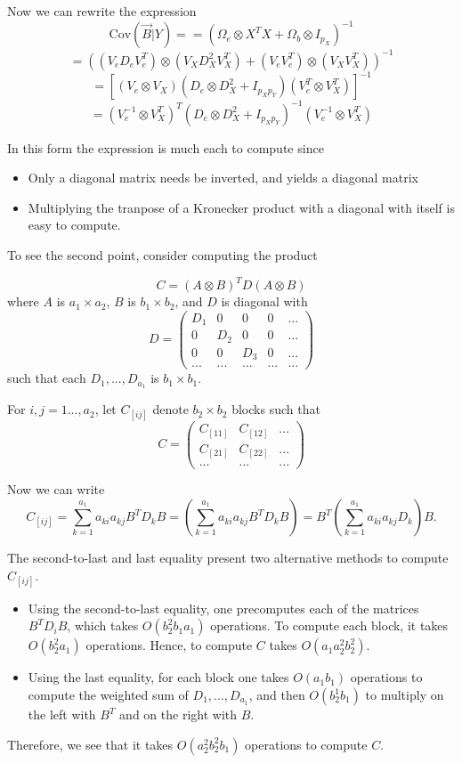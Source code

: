 \documentclass[12pt]{article}
\begin{document}
Now we can rewrite the expression
$$
\text{Cov}(\vec{B}|Y) = = (\Omega_e \otimes X^T X + \Omega_b \otimes I_{p_X})^{-1}
$$
$$
= ((V_e D_e V_e^T) \otimes (V_X D_X^2 V_X^T) + (V_e V_e^T) \otimes (V_X V_X^T))^{-1}
$$
$$
= [(V_e \otimes V_X) (D_e \otimes D_X^2+ I_{p_X p_Y})(V_e^T \otimes V_X^T)]^{-1}
$$
$$
= (V_e^{-1} \otimes V_X^{T})^T (D_e \otimes D_X^2+ I_{p_X p_Y})^{-1} (V_e^{-1} \otimes V_X^{T})
$$

In this form the expression is much each to compute since
\begin{itemize}
\item Only a diagonal matrix needs be inverted, and yields a diagonal matrix
\item Multiplying the tranpose of a Kronecker product with a diagonal with itself is easy to compute.
\end{itemize}
To see the second point, consider computing the product

$$
C = (A \otimes B)^T D (A \otimes B)
$$
where $A$ is $a_1 \times a_2$, $B$ is $b_1 \times b_2$, and $D$ is diagonal with
$$
D = \begin{pmatrix} D_1 & 0 & 0 & 0 &... \\
0 & D_2 & 0 & 0 & ...\\
0 & 0 & D_3 & 0 & ...\\
... & ...& ... & ... & ...
\end{pmatrix}
$$
such that each $D_1,..., D_{a_1}$ is $b_1 \times b_1$.

For $i, j = 1..., a_2$, let $C_{[ij]}$ denote $b_2 \times b_2$ blocks such that
$$
C = \begin{pmatrix} C_{[11]} & C_{[12]} & ...\\
C_{[21]} & C_{[22]} & ... \\
... & ... & ...\end{pmatrix}
$$

Now we can write
$$
C_{[ij]} = \sum_{k=1}^{a_1} a_{ki}a_{kj} B^T D_k B 
= \left(\sum_{k=1}^{a_1} a_{ki} a_{kj} B^T D_k B \right)
= B^T \left(\sum_{k=1}^{a_1} a_{ki} a_{kj} D_k \right) B.
$$

The second-to-last and last equality present two alternative methods to compute $C_{[ij]}$.

\begin{itemize}
\item Using the second-to-last equality, one precomputes each of the matrices $B^T D_i B$, which takes $O(b_2^2 b_1 a_1)$ operations.  To compute each block, it takes $O(b_2^2 a_1)$ operations.  Hence, to compute $C$ takes $O(a_1 a_2^2 b_2^2)$.
\item Using the last equality, for each block one takes $O(a_1 b_1)$ operations to compute the weighted sum of $D_1,..., D_{a_1}$, and then $O(b_2^1 b_1)$ to multiply on the left with $B^T$ and on the right with $B$.
\end{itemize}
Therefore, we see that it takes $O(a_2^2 b_2^2 b_1)$ operations to compute $C$.
\end{document}
